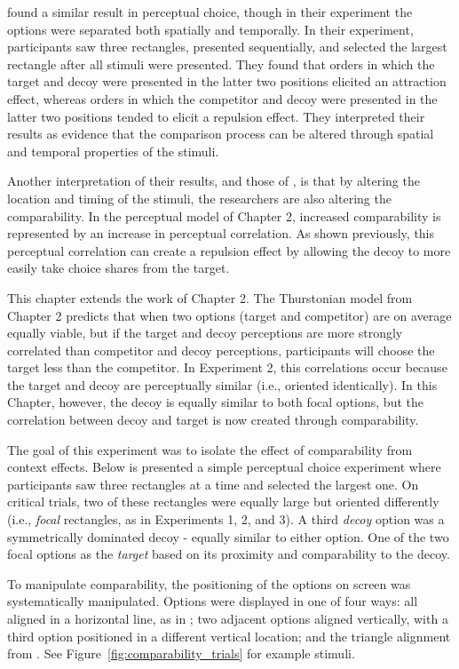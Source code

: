 \textcite{evansImpactPresentationOrder2021} found a similar result in perceptual choice, though in their experiment the options were separated both spatially and temporally. In their experiment, participants saw three rectangles, presented sequentially, and selected the largest rectangle after all stimuli were presented. They found that orders in which the target and decoy were presented in the latter two positions elicited an attraction effect, whereas orders in which the competitor and decoy were presented in the latter two positions tended to elicit a repulsion effect. They interpreted their results as evidence that the comparison process can be altered through spatial and temporal properties of the stimuli.

Another interpretation of their results, and those of \textcite{trueblood2022attentional}, is that by altering the location and timing of the stimuli, the researchers are also altering the comparability. In the perceptual model of Chapter 2, increased comparability is represented by an increase in perceptual correlation. As shown previously, this perceptual correlation can create a repulsion effect by allowing the decoy to more easily take choice shares from the target.

This chapter extends the work of Chapter 2. The Thurstonian model from Chapter 2 predicts that when two options (target and competitor) are on average equally viable, but if the target and decoy perceptions are more strongly correlated than competitor and decoy perceptions, participants will choose the target less than the competitor. In Experiment 2, this correlations occur because the target and decoy are perceptually similar (i.e., oriented identically). In this Chapter, however, the decoy is equally similar to both focal options, but the correlation between decoy and target is now created through comparability.

The goal of this experiment was to isolate the effect of comparability from context effects. Below is presented a simple perceptual choice experiment where participants saw three rectangles at a time and selected the largest one. On critical trials, two of these rectangles were equally large but oriented differently (i.e., \textit{focal} rectangles, as in Experiments 1, 2, and 3). A third \textit{decoy} option was a symmetrically dominated decoy - equally similar to either option. One of the two focal options as the \textit{target} based on its proximity and comparability to the decoy. 

To manipulate comparability, the positioning of the options on screen was systematically manipulated. Options were displayed in one of four ways: all aligned in a horizontal line, as in \textcite{trueblood2013not}; two adjacent options aligned vertically, with a third option positioned in a different vertical location; and the triangle alignment from \textcite{spektorWhenGoodLooks2018b}. See Figure~\ref{fig:comparability_trials} for example stimuli.

